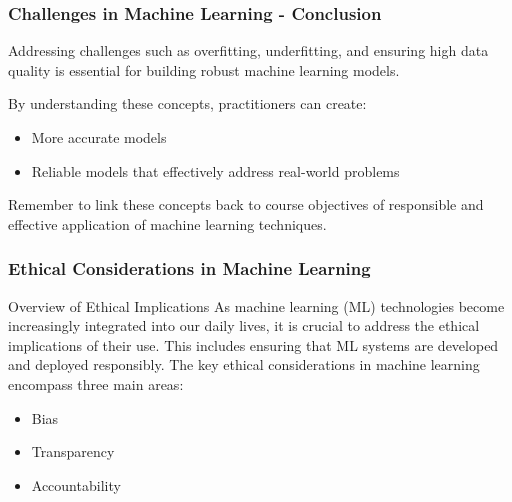 \documentclass[aspectratio=169]{beamer}
\begin{document}
\begin{frame}[fragile]
    \frametitle{Challenges in Machine Learning - Conclusion}
    Addressing challenges such as overfitting, underfitting, and ensuring high data quality is essential for building robust machine learning models.
    
    By understanding these concepts, practitioners can create:
    \begin{itemize}
        \item More accurate models
        \item Reliable models that effectively address real-world problems
    \end{itemize}
    
    Remember to link these concepts back to course objectives of responsible and effective application of machine learning techniques.
\end{frame}

\begin{frame}[fragile]
    \frametitle{Ethical Considerations in Machine Learning}
    \begin{block}{Overview of Ethical Implications}
        As machine learning (ML) technologies become increasingly integrated into our daily lives, it is crucial to address the ethical implications of their use. This includes ensuring that ML systems are developed and deployed responsibly. The key ethical considerations in machine learning encompass three main areas:
        \begin{itemize}
            \item Bias
            \item Transparency
            \item Accountability
        \end{itemize}
    \end{block}
\end{frame}
\end{document}
